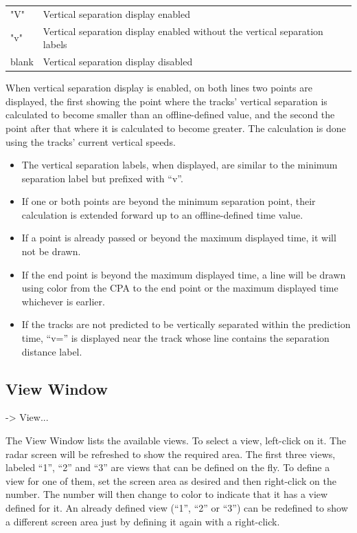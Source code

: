 \documentclass[a4paper,oneside,11pt]{memoir}
\begin{document}
\begin{longtable}{p{5cm} p{7.5cm}}
  "V"   & Vertical separation display enabled\\
  "v"   & Vertical separation display enabled without the vertical separation labels\\
  blank & Vertical separation display disabled\\
\end{longtable}

When vertical separation display is enabled, on both lines two points are displayed, the first showing the point where the tracks’ vertical separation is calculated to become smaller than an offline-defined value, and the second the point after that where it is calculated to become greater. The calculation is done using the tracks’ current vertical speeds.

\begin{itemize}
    \item The vertical separation labels, when displayed, are similar to the minimum separation label but prefixed with “v”.
    \item If one or both points are beyond the minimum separation point, their calculation is extended forward up to an offline-defined time value.
    \item If a point is already passed or beyond the maximum displayed time, it will not be drawn.
    \item If the end point is beyond the maximum displayed time, a line will be drawn using  color from the CPA to the end point or the maximum displayed time whichever is earlier.
    \item If the tracks are not predicted to be vertically separated within the prediction time, “v=” is displayed near the track whose line contains the separation distance label.
\end{itemize}

\subsection{View Window}
\label{win:view}
 -> View...

\bigskip


The View Window lists the available views. To select a view, left-click on it. The radar screen will be refreshed to show the required area. The first three views, labeled “1”, “2” and “3” are views that can be defined on the fly. To define a view for one of them, set the screen area as desired and then right-click on the number. The number will then change to  color to indicate that it has a view defined for it. An already defined view (“1”, “2” or “3”) can be redefined to show a different screen area just by defining it again with a right-click.
\end{document}
